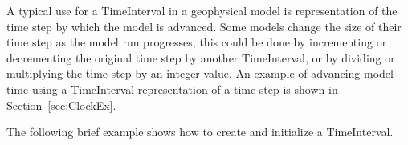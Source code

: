 
A typical use for a TimeInterval in a geophysical model 
is representation of the time step by which the model is 
advanced.  Some models change the size of their time step as 
the model run progresses; this could
be done by incrementing or decrementing the original time 
step by another TimeInterval, or by dividing or multiplying
the time step by an integer value.  An example of advancing 
model time using a TimeInterval representation of a time
step is shown in Section~\ref{sec:ClockEx}.

The following brief example shows how to create and initialize 
a TimeInterval.


